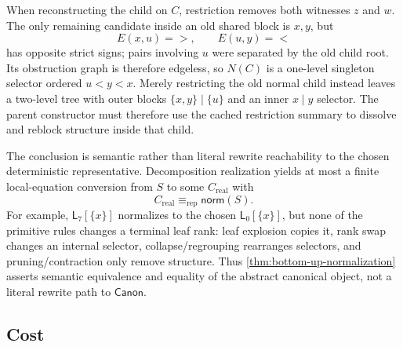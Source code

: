 When reconstructing the child on \(C\), restriction removes both witnesses
\(z\) and \(w\).  The only remaining candidate inside an old shared block is
\(x,y\), but
\[
 E(x,u)=>,\qquad E(u,y)=<
\]
has opposite strict signs; pairs involving \(u\) were separated by the old
child root.  Its obstruction graph is therefore edgeless, so \(N(C)\) is a
one-level singleton selector ordered \(u<y<x\).  Merely restricting the old
normal child instead leaves a two-level tree with outer blocks
\(\{x,y\}\mid\{u\}\) and an inner \(x\mid y\) selector.  The parent
constructor must therefore use the cached restriction summary to dissolve and
reblock structure inside that child.

The conclusion is semantic rather than literal rewrite reachability to the
chosen deterministic representative.  Decomposition realization yields at
most a finite local-equation conversion from \(S\) to some
\(C_{\mathrm{real}}\) with
\begin{equation}
 C_{\mathrm{real}}\equiv_{\mathrm{rep}}\mathsf{norm}(S).
 \label{eq:bottom-up-conversion-mod-rep}
\end{equation}
For example, \(\mathsf L_7[\{x\}]\) normalizes to the chosen
\(\mathsf L_0[\{x\}]\), but none of the primitive rules changes a terminal
leaf rank: leaf explosion copies it, rank swap changes an internal selector,
collapse/regrouping rearranges selectors, and pruning/contraction only remove
structure.  Thus \autoref{thm:bottom-up-normalization} asserts semantic
equivalence and equality of the abstract canonical object, not a literal
rewrite path to \(\mathsf{Canon}\).

\subsection{Cost}

